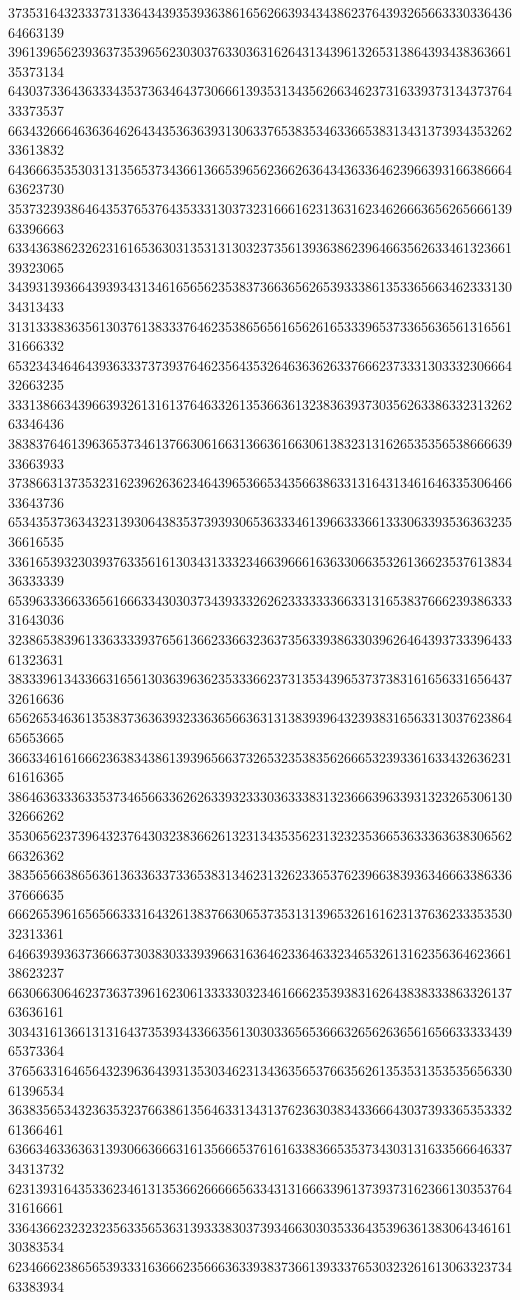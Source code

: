 37353164323337313364343935393638616562663934343862376439326566333033643664663139
39613965623936373539656230303763303631626431343961326531386439343836366135373134
64303733643633343537363464373066613935313435626634623731633937313437376433373537
66343266646363646264343536363931306337653835346336653831343137393435326233613832
64366635353031313565373436613665396562366263643436336462396639316638666463623730
35373239386464353765376435333130373231666162313631623462666365626566613963396663
63343638623262316165363031353131303237356139363862396466356263346132366139323065
34393139366439393431346165656235383736636562653933386135336566346233313034313433
31313338363561303761383337646235386565616562616533396537336563656131656131666332
65323434646439363337373937646235643532646363626337666237333130333230666432663235
33313866343966393261316137646332613536636132383639373035626338633231326263346436
38383764613963653734613766306166313663616630613832313162653535653866663933663933
37386631373532316239626362346439653665343566386331316431346164633530646633643736
65343537363432313930643835373939306536333461396633366133306339353636323536616535
33616539323039376335616130343133323466396661636330663532613662353761383436333339
65396333663365616663343030373439333262623333333663313165383766623938633331643036
32386538396133633339376561366233663236373563393863303962646439373339643361323631
38333961343366316561303639636235333662373135343965373738316165633165643732616636
65626534636135383736363932336365663631313839396432393831656331303762386465653665
36633461616662363834386139396566373265323538356266653239336163343263623161616365
38646363336335373465663362626339323330363338313236663963393132326530613032666262
35306562373964323764303238366261323134353562313232353665363336363830656266326362
38356566386563613633633733653831346231326233653762396638393634666338633637666635
66626539616565663331643261383766306537353131396532616162313763623335353032313361
64663939363736663730383033393966316364623364633234653261316235636462366138623237
66306630646237363739616230613333303234616662353938316264383833386332613763636161
30343161366131316437353934336635613030336565366632656263656165663333343965373364
37656331646564323963643931353034623134363565376635626135353135353565633061396534
36383565343236353237663861356463313431376236303834336664303739336535333261366461
63663463363631393066366631613566653761616338366535373430313163356664633734313732
62313931643533623461313536626666656334313166633961373937316236613035376431616661
33643662323232356335653631393338303739346630303533643539636138306434616130383534
62346662386565393331636662356663633938373661393337653032326161306332373463383934
